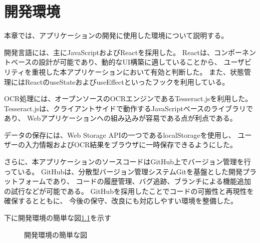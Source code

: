 \documentclass[main]{subfiles}
\begin{document}
\chapter{開発環境}
\label{cha:environment}
本章では、アプリケーションの開発に使用した環境について説明する。

開発言語には、主にJavaScriptおよびReactを採用した。
Reactは、コンポーネントベースの設計が可能であり、動的なUI構築に適していることから、
ユーザビリティを重視した本アプリケーションにおいて有効と判断した。
また、状態管理にはReactのuseStateおよびuseEffectといったフックを利用している。

OCR処理には、オープンソースのOCRエンジンであるTesseract.jsを利用した。
Tesseract.jsは、クライアントサイドで動作するJavaScriptベースのライブラリであり、
Webアプリケーションへの組み込みが容易である点が利点である。

データの保存には、Web Storage APIの一つであるlocalStorageを使用し、
ユーザーの入力情報およびOCR結果をブラウザに一時保存できるようにした。

さらに、本アプリケーションのソースコードはGitHub上でバージョン管理を行っている。
GitHubは、分散型バージョン管理システムGitを基盤とした開発プラットフォームであり、
コードの履歴管理、バグ追跡、ブランチによる機能追加の試行などが可能である。
GitHubを採用したことでコードの可搬性と再現性を確保するとともに、
今後の保守、改良にも対応しやすい環境を整備した。

下に開発環境の簡単な図\ref{fig:environment}を示す

\begin{figure}[tb]
    \begin{center}
        \caption{開発環境の簡単な図}
        \label{fig:environment}
    \end{center}

\end{figure}
\end{document}
